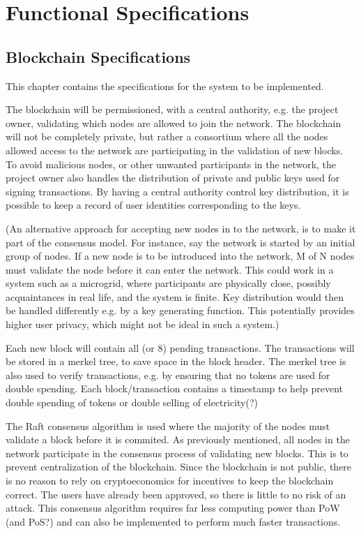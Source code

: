\chapter{Functional Specifications}

\section{Blockchain Specifications}
This chapter contains the specifications for the system to be implemented. 

The blockchain will be permissioned, with a central authority, e.g. the project owner, validating which nodes are allowed to join the network. The blockchain will not be completely private, but rather a consortium where all the nodes allowed access to the network are participating in the validation of new blocks. To avoid malicious nodes, or other unwanted participants in the network, the project owner also handles the distribution of private and public keys used for signing transactions. By having a central authority control key distribution, it is possible to keep a record of user identities corresponding to the keys. 

(An alternative approach for accepting new nodes in to the network, is to make it part of the consensus model. For instance, say the network is started by an initial group of nodes. If a new node is to be introduced into the network, M of N nodes must validate the node before it can enter the network. This could work in a system such as a microgrid, where participants are physically close, possibly acquaintances in real life, and the system is finite. Key distribution would then be handled differently e.g. by a key generating function. This potentially provides higher user privacy, which might not be ideal in such a system.)

Each new block will contain all (or 8) pending transactions. The transactions will be stored in a merkel tree, to save space in the block header. The merkel tree is also used to verify transactions, e.g. by ensuring that no tokens are used for double spending. %
Each block/transaction contains a timestamp to help prevent double spending of tokens or double selling of electricity(?)%

The Raft consensus algorithm is used where the majority of the nodes must validate a block before it is commited. As previously mentioned, all nodes in the network participate in the consensus process of validating new blocks. This is to prevent centralization of the blockchain. Since the blockchain is not public, there is no reason to rely on cryptoeconomics for incentives to keep the blockchain correct. The users have already been approved, so there is little to no risk of an attack. This consensus algorithm requires far less computing power than PoW (and PoS?) and can also be implemented to perform much faster transactions. %


